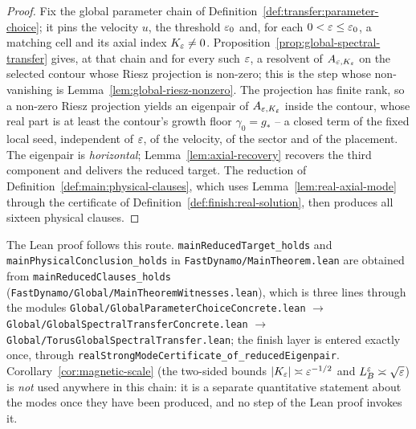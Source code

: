 \begin{proof}
  \leanok
  Fix the global parameter chain of
  Definition~\ref{def:transfer:parameter-choice}; it pins the velocity $u$,
  the threshold $\varepsilon_0$ and, for each $0<\varepsilon\leq\varepsilon_0$, a matching cell and
  its axial index $K_\varepsilon\neq0$.  Proposition~\ref{prop:global-spectral-transfer}
  gives, at that chain and for every such $\varepsilon$, a resolvent of
  $A_{\varepsilon,K_\varepsilon}$ on the selected contour whose Riesz projection is non-zero;
  this is the step whose non-vanishing is
  Lemma~\ref{lem:global-riesz-nonzero}.  The projection has finite rank, so a
  non-zero Riesz projection yields an eigenpair of $A_{\varepsilon,K_\varepsilon}$
  inside the contour, whose real part is at least the contour's growth floor
  $\gamma_0=g_*$ -- a closed term of the fixed local seed, independent of
  $\varepsilon$, of the velocity, of the sector and of the placement.  The eigenpair is
  \emph{horizontal}; Lemma~\ref{lem:axial-recovery} recovers the third component and
  delivers the reduced target.  The reduction of
  Definition~\ref{def:main:physical-clauses}, which uses
  Lemma~\ref{lem:real-axial-mode} through the certificate of
  Definition~\ref{def:finish:real-solution}, then produces all sixteen physical
  clauses.
\end{proof}

The Lean proof follows this route.  \texttt{mainReducedTarget\_holds} and
\texttt{mainPhysicalConclusion\_holds} in \texttt{FastDynamo/MainTheorem.lean} are obtained
from \texttt{mainReducedClauses\_holds}
(\texttt{FastDynamo/Global/MainTheoremWitnesses.lean}), which is three lines through the
modules
\texttt{Global/GlobalParameterChoiceConcrete.lean} $\to$
\texttt{Global/GlobalSpectralTransferConcrete.lean} $\to$
\texttt{Global/TorusGlobalSpectralTransfer.lean}; the finish layer is entered exactly once,
through \texttt{realStrongModeCertificate\_of\_reducedEigenpair}.
Corollary~\ref{cor:magnetic-scale} (the two-sided bounds
$\left\lvert K_\varepsilon\right\rvert\asymp\varepsilon^{-1/2}$ and $L_B^\varepsilon\asymp\sqrt{\varepsilon}$) is \emph{not} used anywhere
in this chain: it is a separate quantitative statement about the modes once they have been
produced, and no step of the Lean proof invokes it.

